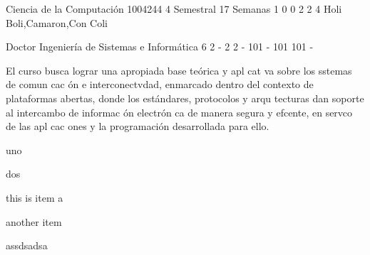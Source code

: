 \documentclass[a4paper,8pt]{article}
\date{}
\begin{document}


\sylabusHeader

\academicaTable
{Ciencia de la Computación} %
{1004244} %
{4} %
{Semestral} %
{17 Semanas} %
{1} %
{0} %
{0} %
{2}  %
{2} %
{4} %
{Holi Boli,Camaron,Con Coli} %

\administrativaTable
{Doctor} %
{Ingeniería de Sistemas e Informática} %
{6} %
{2} %
{-} %
{2} %
{2} %
{-} %
{101} %
{-} %
{101} %
{101} %
{-} %


\begin{fundamentacion}
El curso busca lograr una apropiada base te\'orica $\mathrm{y}$ apl cat va sobre los sstemas de comun cac ón $\mathrm{e}$ interconectvdad, enmarcado dentro del contexto de plataformas abertas, donde los estándares, protocolos $\mathrm{y}$ arqu tecturas dan soporte al intercambo de informac ón electrón ca de manera segura $\mathrm{y}$ efcente, en servco de las apl cac ones $\mathrm{y}$ la programación desarrollada para ello.
\end{fundamentacion}

\begin{sumilla}
\item uno
\item dos
\end{sumilla}

\begin{competenciasAsignatura}
\item this is item a
\item another item
\item assdsadsa
\end{competenciasAsignatura}

\begin{contenidos}



\end{contenidos}
\end{document}
